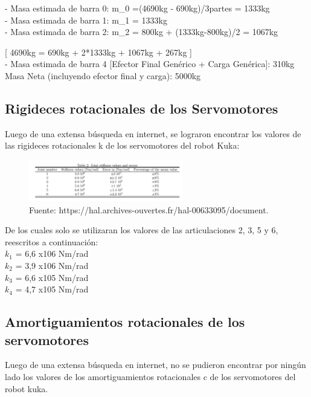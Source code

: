 \documentclass{aleph-revista}
\begin{document}
- Masa estimada de barra 0:	m_{0} =(4690kg - 690kg)/3partes = 1333kg\\

- Masa estimada de barra 1: m_{1} = 1333kg\\

- Masa estimada de barra 2: m_{2} = 800kg + (1333kg-800kg)/2 = 1067kg

[ 4690kg = 690kg + 2*1333kg + 1067kg + 267kg ]\\

- Masa estimada de barra 4 [Efector Final Genérico + Carga Genérica]:  310kg\\

Masa Neta (incluyendo efector final y carga):  5000kg

\subsection{Rigideces rotacionales de los Servomotores}

Luego de una extensa búsqueda en internet, se lograron encontrar los valores de las rigideces rotacionales k de los servomotores del robot Kuka:

\begin{figure}[H]
    \centering
    \includegraphics[width=0.60\textwidth]{Imagenes/ks.png}
    \caption{Fuente: https://hal.archives-ouvertes.fr/hal-00633095/document.}
    \label{fig:etiqueta de la figura}
\end{figure}

De los cuales solo se utilizaran los valores de las articulaciones 2, 3, 5 y 6, reescritos a continuación:
\\$k_1$ = 6,6 x106 Nm/rad
\\$k_2$ = 3,9 x106 Nm/rad
\\$k_3$ = 6,6 x105 Nm/rad
\\$k_4$ = 4,7 x105 Nm/rad

\subsection{Amortiguamientos rotacionales de los servomotores}

Luego de una extensa búsqueda en internet, no se pudieron encontrar por ningún lado los 
valores de los amortiguamientos rotacionales c de los servomotores del robot kuka.
\end{document}
